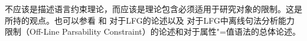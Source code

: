不应该是描述语言约束理论，而应该是理论包含必须适用于研究对象的限制。这是 \citet[, 280]{Chomsky81b}所持的观点。也可以参看 和 对于LFG的论述以及 对于LFG中离线句法分析能力限制（Off-Line Parsability Constraint）的论述和对于属性"=值语法的总体论述。
